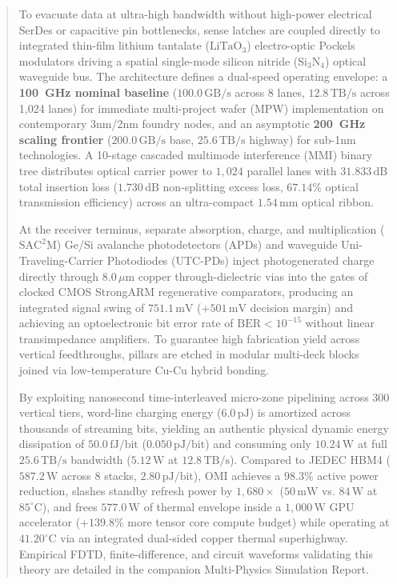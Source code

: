 \documentclass[journal]{IEEEtran}
\begin{document}
\begin{abstract}
To evacuate data at ultra-high bandwidth without high-power electrical SerDes or capacitive pin bottlenecks, sense latches are coupled directly to integrated thin-film lithium tantalate ($\text{LiTaO}_3$) electro-optic Pockels modulators driving a spatial single-mode silicon nitride ($\text{Si}_3\text{N}_4$) optical waveguide bus. The architecture defines a dual-speed operating envelope: a \textbf{100~GHz nominal baseline} ($100.0\,\text{GB/s}$ across 8 lanes, $12.8\,\text{TB/s}$ across 1,024 lanes) for immediate multi-project wafer (MPW) implementation on contemporary 3nm/2nm foundry nodes, and an asymptotic \textbf{200~GHz scaling frontier} ($200.0\,\text{GB/s}$ base, $25.6\,\text{TB/s}$ highway) for sub-1nm technologies. A 10-stage cascaded multimode interference (MMI) binary tree distributes optical carrier power to $1,024$ parallel lanes with $31.833\,\text{dB}$ total insertion loss ($1.730\,\text{dB}$ non-splitting excess loss, $67.14\%$ optical transmission efficiency) across an ultra-compact $1.54\,\text{mm}$ optical ribbon.

At the receiver terminus, separate absorption, charge, and multiplication ($\text{SAC}^2\text{M}$) Ge/Si avalanche photodetectors (APDs) and waveguide Uni-Traveling-Carrier Photodiodes (UTC-PDs) inject photogenerated charge directly through $8.0\,\mu\text{m}$ copper through-dielectric vias into the gates of clocked CMOS StrongARM regenerative comparators, producing an integrated signal swing of $751.1\,\text{mV}$ ($+501\,\text{mV}$ decision margin) and achieving an optoelectronic bit error rate of $\text{BER} < 10^{-15}$ without linear transimpedance amplifiers. To guarantee high fabrication yield across vertical feedthroughs, pillars are etched in modular multi-deck blocks joined via low-temperature Cu-Cu hybrid bonding.

By exploiting nanosecond time-interleaved micro-zone pipelining across 300 vertical tiers, word-line charging energy ($6.0\,\text{pJ}$) is amortized across thousands of streaming bits, yielding an authentic physical dynamic energy dissipation of $50.0\,\text{fJ/bit}$ ($0.050\,\text{pJ/bit}$) and consuming only $10.24\,\text{W}$ at full $25.6\,\text{TB/s}$ bandwidth ($5.12\,\text{W}$ at $12.8\,\text{TB/s}$). Compared to JEDEC HBM4 ($587.2\,\text{W}$ across 8 stacks, $2.80\,\text{pJ/bit}$), OMI achieves a $98.3\%$ active power reduction, slashes standby refresh power by $1,680\times$ ($50\,\text{mW}$ vs. $84\,\text{W}$ at $85^\circ\text{C}$), and frees $577.0\,\text{W}$ of thermal envelope inside a $1,000\,\text{W}$ GPU accelerator ($+139.8\%$ more tensor core compute budget) while operating at $41.20^\circ\text{C}$ via an integrated dual-sided copper thermal superhighway. Empirical FDTD, finite-difference, and circuit waveforms validating this theory are detailed in the companion Multi-Physics Simulation Report.
\end{abstract}
\end{document}
